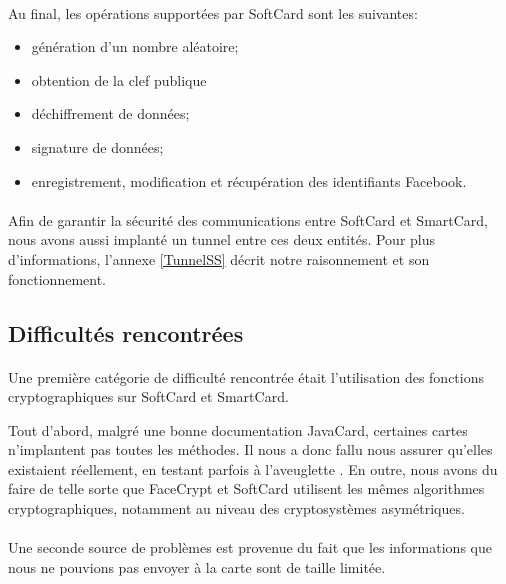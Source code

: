 \documentclass[a4paper,11pt,french]{article}
\begin{document}
\paragraph{}
Au final, les opérations supportées par SoftCard sont les suivantes:  
\begin{itemize}
    \item génération d'un nombre aléatoire;
    \item obtention de la clef publique
    \item déchiffrement de données;
    \item signature de données;
    \item enregistrement, modification et récupération des identifiants Facebook.
\end{itemize}

\paragraph{}
Afin de garantir la sécurité des communications entre SoftCard et SmartCard,
nous avons aussi implanté un tunnel entre ces deux entités. Pour plus 
d'informations, l'annexe \ref{TunnelSS} décrit notre raisonnement et son
fonctionnement.

\subsection{Difficultés rencontrées}
\paragraph{}
Une première catégorie de difficulté rencontrée était l'utilisation des fonctions
cryptographiques sur SoftCard et SmartCard.

Tout d'abord, malgré une bonne documentation JavaCard, certaines cartes 
n'implantent pas toutes les méthodes. Il nous a donc fallu nous assurer 
qu'elles existaient réellement, en testant parfois \og à l'aveuglette 
\fg{}. En outre, nous avons du faire de telle sorte que FaceCrypt et SoftCard 
utilisent les mêmes algorithmes cryptographiques, notamment au niveau des 
cryptosystèmes asymétriques.

\paragraph{}
Une seconde source de problèmes est provenue du fait que les informations que nous
ne pouvions pas envoyer à la carte sont de taille limitée. 
\end{document}

